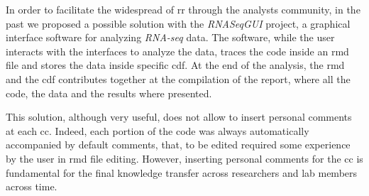 In order to facilitate the widespread of \gls{rr} through the analysts community, in the past we proposed a possible solution with the \textit{RNASeqGUI} \cite{russo2015advantages} project, a graphical interface software for analyzing \textit{RNA-seq} data.
The software, while the user interacts with the interfaces to analyze the data, traces the code inside an \gls{rmd} file and stores the data inside specific \gls{cdf}.
At the end of the analysis, the \gls{rmd} and the \gls{cdf} contributes together at the compilation of the report, where all the code, the data and the results where presented.

This solution, although very useful, does not allow to insert personal comments at each \gls{cc}.
Indeed, each portion of the code was always automatically accompanied by default comments, that, to be edited required some experience by the user in \gls{rmd} file editing.
However, inserting personal comments for the \gls{cc} is fundamental for the final knowledge transfer across researchers and lab members across time.


